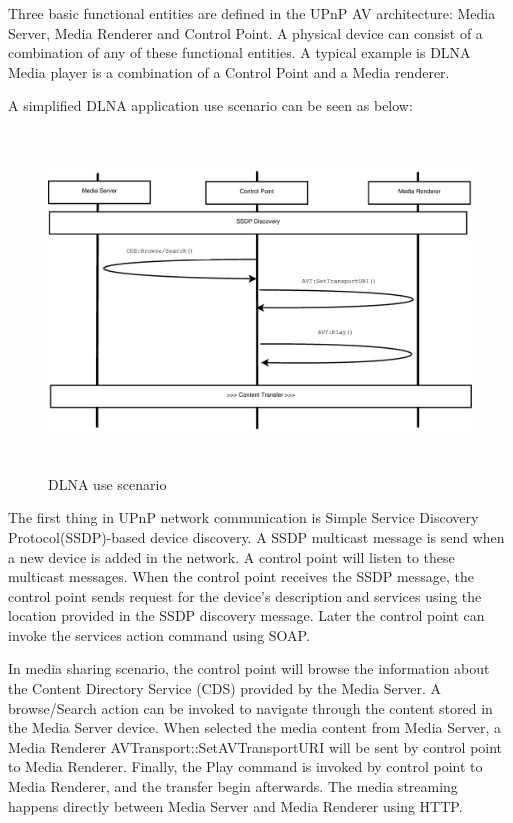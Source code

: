 Three basic functional entities are defined in the UPnP AV architecture: Media Server, Media 
Renderer and Control Point. A physical device can consist of a combination of any of these 
functional entities. A typical example is DLNA Media player is
a combination of a Control Point and a Media renderer.

A simplified DLNA application use scenario\cite{DLNA_proxy} can be seen as
below:

\begin{figure}[htb]
\centering \includegraphics[height=9cm]{charts/chart1}
\caption{DLNA use scenario \label{chart1}}
\end{figure}

The first thing in UPnP network communication is Simple Service Discovery Protocol(SSDP)-based 
device discovery. A SSDP multicast message is send when a new device is added in the network. 
A control point will listen to these multicast messages. When the control point receives the SSDP 
message, the control point sends request for the device's description and services using the location 
provided in the SSDP discovery message. Later the control point can invoke the services action 
command using SOAP.

In media sharing scenario, the control point will browse the information about the Content 
Directory Service (CDS) provided by the Media Server. A browse/Search action can be invoked 
to navigate through the content stored in the Media Server device. When selected the media 
content from Media Server, a Media Renderer AVTransport::SetAVTransportURI will be sent by 
control point to Media Renderer. Finally, the Play command is invoked by control point to 
Media Renderer, and the transfer begin afterwards. The media streaming happens directly 
between Media Server and Media Renderer using HTTP.


